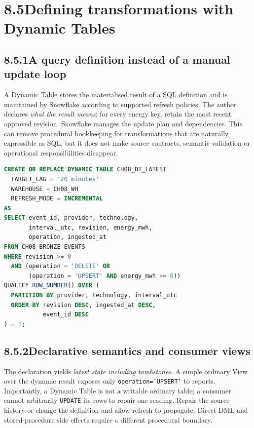 \documentclass[11pt,twoside]{article}
\newcommand{\topic}[2]{\subsection*{#1\quad #2}}
\begin{document}
\section*{8.5\quad Defining transformations with Dynamic Tables}
\topic{8.5.1}{A query definition instead of a manual update loop}
A Dynamic Table stores the materialised result of a SQL definition and is maintained by Snowflake according to supported refresh policies. The author declares \emph{what the result means}: for every energy key, retain the most recent approved revision. Snowflake manages the update plan and dependencies. This can remove procedural bookkeeping for transformations that are naturally expressible as SQL, but it does not make source contracts, semantic validation or operational responsibilities disappear.
\begin{lstlisting}[language=SQL,caption={Declaration of a latest-revision materialisation; requires approved warehouse.}]
CREATE OR REPLACE DYNAMIC TABLE CH08_DT_LATEST
  TARGET_LAG = '20 minutes'
  WAREHOUSE = CH08_WH
  REFRESH_MODE = INCREMENTAL
AS
SELECT event_id, provider, technology,
       interval_utc, revision, energy_mwh,
       operation, ingested_at
FROM CH08_BRONZE_EVENTS
WHERE revision >= 0
  AND (operation = 'DELETE' OR
       (operation = 'UPSERT' AND energy_mwh >= 0))
QUALIFY ROW_NUMBER() OVER (
  PARTITION BY provider, technology, interval_utc
  ORDER BY revision DESC, ingested_at DESC,
           event_id DESC
) = 1;
\end{lstlisting}
\topic{8.5.2}{Declarative semantics and consumer views}
The declaration yields \emph{latest state including tombstones}. A simple ordinary View over the dynamic result exposes only \texttt{operation='UPSERT'} to reports. Importantly, a Dynamic Table is not a writable ordinary table; a consumer cannot arbitrarily \texttt{UPDATE} its rows to repair one reading. Repair the source history or change the definition and allow refresh to propagate. Direct DML and stored-procedure side effects require a different procedural boundary.
\end{document}
